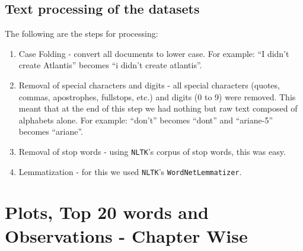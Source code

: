 \documentclass{article}
\begin{document}
\subsection{Text processing of the datasets}
\begin{flushleft}
The following are the steps for processing:
\begin{enumerate}
\item Case Folding - convert all documents to lower case. For example: ``I didn't create Atlantis'' becomes ``i didn't create atlantis''.
\item Removal of special characters and digits - all special characters (quotes, commas, apostrophes, fullstops, etc.) and digits (0 to 9) were removed. This meant that at the end of this step we had nothing but raw text composed of alphabets alone. For example: ``don't'' becomes ``dont'' and ``ariane-5'' becomes ``ariane''.
\item Removal of stop words - using \texttt{NLTK}'s corpus of stop words, this was easy.
\item Lemmatization - for this we used \texttt{NLTK}'s \texttt{WordNetLemmatizer}.
\end{enumerate}
\end{flushleft}
\newpage

\section{Plots, Top 20 words and Observations - Chapter Wise}
\end{document}
